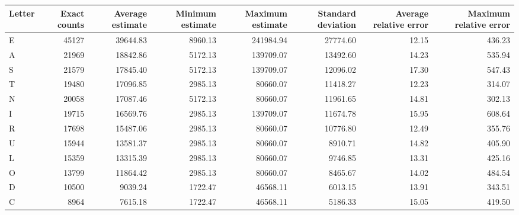 \begin{tabular}{lrrrrrrr}
\toprule
Letter &  Exact counts &  Average estimate &  Minimum estimate &  Maximum estimate &  Standard deviation &  Average relative error &  Maximum relative error \\
\midrule
     E &         45127 &          39644.83 &           8960.13 &         241984.94 &            27774.60 &                   12.15 &                  436.23 \\
     A &         21969 &          18842.86 &           5172.13 &         139709.07 &            13492.60 &                   14.23 &                  535.94 \\
     S &         21579 &          17845.40 &           5172.13 &         139709.07 &            12096.02 &                   17.30 &                  547.43 \\
     T &         19480 &          17096.85 &           2985.13 &          80660.07 &            11418.27 &                   12.23 &                  314.07 \\
     N &         20058 &          17087.46 &           5172.13 &          80660.07 &            11961.65 &                   14.81 &                  302.13 \\
     I &         19715 &          16569.76 &           2985.13 &         139709.07 &            11674.78 &                   15.95 &                  608.64 \\
     R &         17698 &          15487.06 &           2985.13 &          80660.07 &            10776.80 &                   12.49 &                  355.76 \\
     U &         15944 &          13581.37 &           2985.13 &          80660.07 &             8910.71 &                   14.82 &                  405.90 \\
     L &         15359 &          13315.39 &           2985.13 &          80660.07 &             9746.85 &                   13.31 &                  425.16 \\
     O &         13799 &          11864.42 &           2985.13 &          80660.07 &             8465.67 &                   14.02 &                  484.54 \\
     D &         10500 &           9039.24 &           1722.47 &          46568.11 &             6013.15 &                   13.91 &                  343.51 \\
     C &          8964 &           7615.18 &           1722.47 &          46568.11 &             5186.33 &                   15.05 &                  419.50 \\

\end{tabular}
